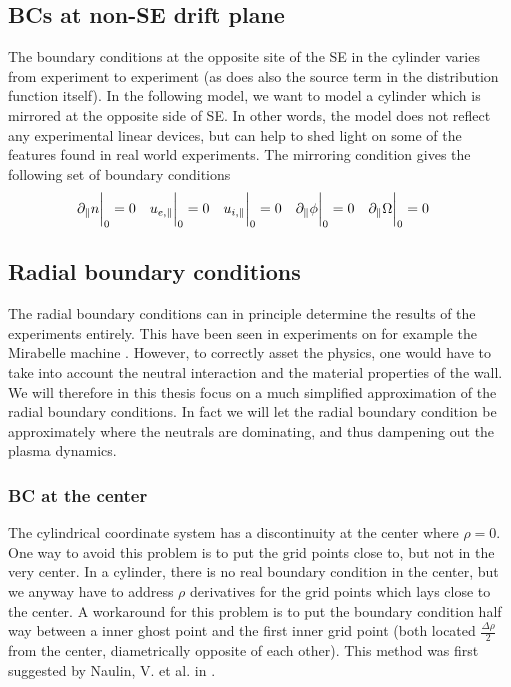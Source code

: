 \subsection{BCs at non-SE drift plane}
The boundary conditions at the opposite site of the SE in the cylinder varies from experiment to experiment (as does also the source term in the distribution function itself).
In the following model, we want to model a cylinder which is mirrored at the opposite side of SE.
In other words, the model does not reflect any experimental linear devices, but can help to shed light on some of the features found in real world experiments.
The mirroring condition gives the following set of boundary conditions
%
\begin{align*}
    &\partial_\| n \bigg|_0    =0 &
    &u_{e,\|} \bigg|_0         =0 &
    &u_{i,\|} \bigg|_0         =0 &
    &\partial_\| \phi \bigg|_0 =0 &
    &\partial_\|\Omega \bigg|_0   =0 &
\end{align*}

\subsection{Radial boundary conditions}
%
The radial boundary conditions can in principle determine the results of the experiments entirely.
This have been seen in experiments on for example the Mirabelle machine \cite{Schroder2001}.
However, to correctly asset the physics, one would have to take into account the neutral interaction and the material properties of the wall.
We will therefore in this thesis focus on a much simplified approximation of the radial boundary conditions.
In fact we will let the radial boundary condition be approximately where the neutrals are dominating, and thus dampening out the plasma dynamics.

\subsubsection{BC at the center}
%
The cylindrical coordinate system has a discontinuity at the center where $\rho=0$.
One way to avoid this problem is to put the grid points close to, but not in the very center.
In a cylinder, there is no real boundary condition in the center, but we anyway have to address $\rho$ derivatives for the grid points which lays close to the center.
A workaround for this problem is to put the boundary condition half way between a inner ghost point and the first inner grid point (both located $\frac{\Delta \rho}{2}$ from the center, diametrically opposite of each other).
This method was first suggested by Naulin, V. et al. in \cite{Naulin2008}.


